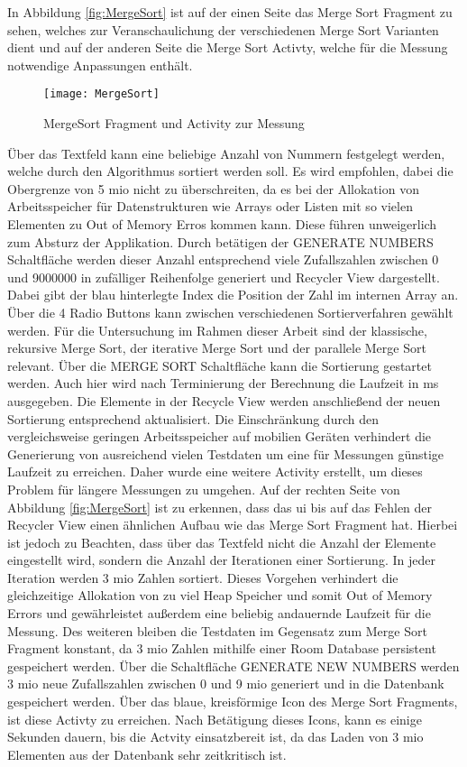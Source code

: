 In Abbildung \autoref{fig:MergeSort} ist auf der einen Seite das Merge Sort Fragment zu sehen, welches zur Veranschaulichung der verschiedenen Merge Sort Varianten dient und auf der anderen Seite die Merge Sort Activty, welche für die Messung notwendige Anpassungen enthält. 
\begin{figure}[H]
\begin{center}
	\texttt{[image: MergeSort]}
	\caption{MergeSort Fragment und Activity zur Messung}
	\label{fig:MergeSort} 
\end{center}
\end{figure}
Über das Textfeld kann eine beliebige Anzahl von Nummern festgelegt werden, welche durch den Algorithmus sortiert werden soll. Es wird empfohlen, dabei die Obergrenze von 5 \ac{mio} nicht zu überschreiten, da es bei der Allokation von Arbeitsspeicher für Datenstrukturen wie Arrays oder Listen mit so vielen Elementen zu Out of Memory Erros kommen kann. Diese führen unweigerlich zum Absturz der Applikation. Durch betätigen der \glqq GENERATE NUMBERS\grqq{} Schaltfläche werden dieser Anzahl entsprechend viele Zufallszahlen zwischen 0 und 9000000 in zufälliger Reihenfolge generiert und Recycler View dargestellt. Dabei gibt der blau hinterlegte Index die Position der Zahl im internen Array an. Über die 4 Radio Buttons kann zwischen verschiedenen Sortierverfahren gewählt werden. Für die Untersuchung im Rahmen dieser Arbeit sind der klassische, rekursive Merge Sort, der iterative Merge Sort und der parallele Merge Sort relevant. Über die \glqq MERGE SORT\grqq{} Schaltfläche kann die Sortierung gestartet werden. Auch hier wird nach Terminierung der Berechnung die Laufzeit in \ac{ms} ausgegeben. Die Elemente in der Recycle View werden anschließend der neuen Sortierung entsprechend aktualisiert. Die Einschränkung durch den vergleichsweise geringen Arbeitsspeicher auf mobilien Geräten verhindert die Generierung von ausreichend vielen Testdaten um eine für Messungen günstige Laufzeit zu erreichen. Daher wurde eine weitere Activity erstellt, um dieses Problem für längere Messungen zu umgehen. Auf der rechten Seite von Abbildung \autoref{fig:MergeSort} ist zu erkennen, dass das \ac{ui} bis auf das Fehlen der Recycler View einen ähnlichen Aufbau wie das Merge Sort Fragment hat. Hierbei ist jedoch zu Beachten, dass über das Textfeld nicht die Anzahl der Elemente eingestellt wird, sondern die Anzahl der Iterationen einer Sortierung. In jeder Iteration werden 3 \ac{mio} Zahlen sortiert. Dieses Vorgehen verhindert die gleichzeitige Allokation von zu viel Heap Speicher und somit Out of Memory Errors und gewährleistet außerdem eine beliebig andauernde Laufzeit für die Messung. Des weiteren bleiben die Testdaten im Gegensatz zum Merge Sort Fragment konstant, da 3 \ac{mio} Zahlen mithilfe einer Room Database persistent gespeichert werden. Über die Schaltfläche \glqq GENERATE NEW NUMBERS\grqq{} werden 3 \ac{mio} neue Zufallszahlen zwischen 0 und 9 \ac{mio} generiert und in die Datenbank gespeichert werden. Über das blaue, kreisförmige Icon des Merge Sort Fragments, ist diese Activty zu erreichen. Nach Betätigung dieses Icons, kann es einige Sekunden dauern, bis die Actvity einsatzbereit ist, da das Laden von 3 \ac{mio} Elementen aus der Datenbank sehr zeitkritisch ist.
